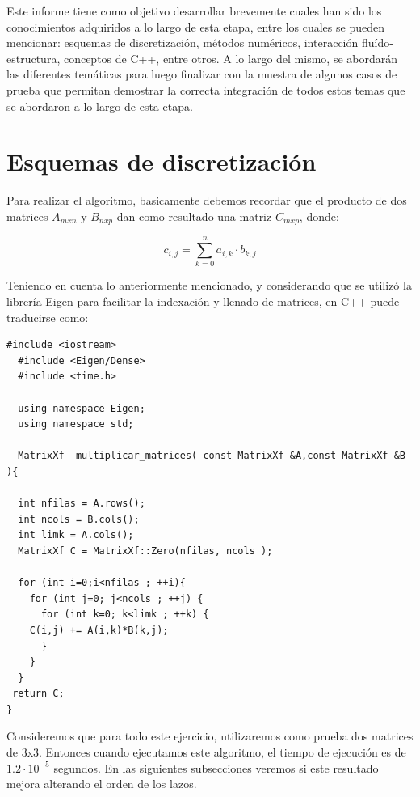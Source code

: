 Este informe tiene como objetivo desarrollar brevemente cuales han
sido los conocimientos adquiridos a lo largo de esta etapa, entre los
cuales se pueden mencionar: esquemas de discretización, métodos
numéricos, interacción fluído-estructura, conceptos de C++, entre
otros. A lo largo del mismo, se abordarán las diferentes temáticas
para luego finalizar con la muestra de algunos casos de prueba que
permitan demostrar la correcta integración de todos estos temas que se
abordaron a lo largo de esta etapa.

\section{Esquemas de discretización}
\label{sec:discretizacion}
Para realizar el algoritmo, basicamente debemos recordar que el
producto de dos matrices $A_{mxn}$ y $B_{nxp}$ dan como resultado una matriz
$C_{mxp}$, donde:

\begin{equation}
  c_{i,j} = \sum_{k=0}^n a_{i,k} \cdot b_{k,j} 
\end{equation}

Teniendo en cuenta lo anteriormente mencionado, y considerando que se
utilizó la librería Eigen para facilitar la indexación y llenado de
matrices, en C++ puede traducirse como:

\lstset{language=C++, breaklines=true, basicstyle=\footnotesize}
\begin{lstlisting}[frame=single]
  #include <iostream>
  #include <Eigen/Dense>
  #include <time.h>

  using namespace Eigen;
  using namespace std;

  MatrixXf  multiplicar_matrices( const MatrixXf &A,const MatrixXf &B ){

  int nfilas = A.rows();
  int ncols = B.cols();
  int limk = A.cols();
  MatrixXf C = MatrixXf::Zero(nfilas, ncols );
  
  for (int i=0;i<nfilas ; ++i){
    for (int j=0; j<ncols ; ++j) {
      for (int k=0; k<limk ; ++k) {
	C(i,j) += A(i,k)*B(k,j);
      }  
    }
  }
 return C;
}

\end{lstlisting}

Consideremos que para todo este ejercicio, utilizaremos como prueba
dos matrices de 3x3. Entonces cuando ejecutamos este algoritmo,  el
tiempo de ejecución es de $1.2\cdot10^{-5}$ segundos. En las
siguientes subsecciones veremos si este resultado mejora alterando el
orden de los lazos. 

